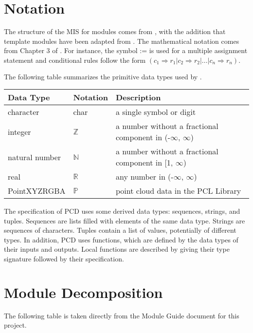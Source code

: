 \documentclass[12pt, titlepage]{article}
\begin{document}
\section{Notation}

The structure of the MIS for modules comes from \citet{HoffmanAndStrooper1995},
with the addition that template modules have been adapted from
\cite{GhezziEtAl2003}.  The mathematical notation comes from Chapter 3 of
\citet{HoffmanAndStrooper1995}.  For instance, the symbol := is used for a
multiple assignment statement and conditional rules follow the form $(c_1
\Rightarrow r_1 | c_2 \Rightarrow r_2 | ... | c_n \Rightarrow r_n )$.

The following table summarizes the primitive data types used by \progname. 

\begin{center}
\renewcommand{\arraystretch}{1.2}
\noindent 
\begin{tabular}{l l p{7.5cm}} 
\toprule 
\textbf{Data Type} & \textbf{Notation} & \textbf{Description}\\ 
\midrule
character & char & a single symbol or digit\\
integer & $\mathbb{Z}$ & a number without a fractional component in (-$\infty$, $\infty$) \\
natural number & $\mathbb{N}$ & a number without a fractional component in [1, $\infty$) \\
real & $\mathbb{R}$ & any number in (-$\infty$, $\infty$)\\
PointXYZRGBA & $\mathbb{P}$ & point cloud data in the PCL Library\\
\bottomrule
\end{tabular} 
\end{center}

\noindent
The specification of PCD uses some derived data types: sequences, strings, and
tuples. Sequences are lists filled with elements of the same data type. Strings
are sequences of characters. Tuples contain a list of values, potentially of
different types. In addition, PCD uses functions, which
are defined by the data types of their inputs and outputs. Local functions are
described by giving their type signature followed by their specification.

\section{Module Decomposition}

The following table is taken directly from the Module Guide document for this project.
\end{document}
